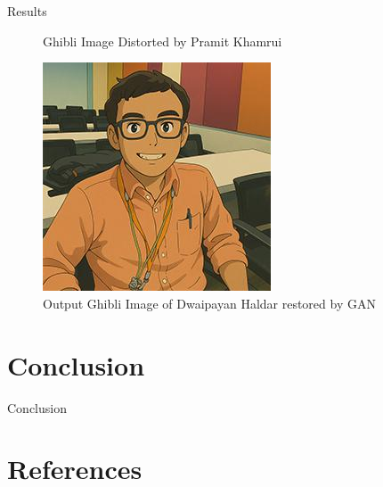\documentclass{beamer}
\begin{document}
\begin{frame}{Results}
\begin{figure}[h]
\begin{minipage}{0.32\textwidth}
        \caption{Ghibli Image Distorted by Pramit Khamrui}
    \end{minipage}
    \hfill
    \begin{minipage}{0.32\textwidth}
        \centering
        \includegraphics[width=\linewidth]{out_Image_ghibli.jpg} %
        \caption{Output Ghibli Image of Dwaipayan Haldar restored by GAN}
    \end{minipage}
\end{figure}
    
\end{frame}



\section{Conclusion}

\begin{frame}{}
    \centering
    \Huge{Conclusion}
\end{frame}

\section{References}
\end{document}
